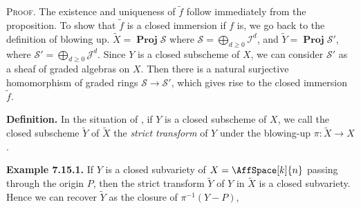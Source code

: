 {\smallskip
\noindent\textsc{Proof.} The existence and uniqueness of $\widetilde f$ follow immediately from the proposition. To show that $\widetilde f$ is a closed immersion if $f$ is, we go back to the definition of blowing up. $\widetilde X=\operatorname{\mathbf{Proj}}\mathcal S$ where $\mathcal S=\bigoplus_{d\geq0}\mathcal I^d$, and $\widetilde Y=\operatorname{\mathbf{Proj}}\mathcal S'$, where $\mathcal S'=\bigoplus_{d\geq0}\mathcal J^d$. Since $Y$ is a closed subscheme of $X$, we can consider $\mathcal S'$ as a sheaf of graded algebras on $X$. Then there is a natural surjective homomorphism of graded rings $\mathcal S\to\mathcal S'$, which gives rise to the closed immersion $\widetilde f$.

\medskip
\noindent\textbf{Definition.} In the situation of , if $Y$ is a closed subscheme of $X$, we call the closed subscheme $\widetilde Y$ of $\widetilde X$ the \emph{strict transform} of $Y$ under the blowing-up $\pi\colon\widetilde X\to X$.

\medskip
\noindent\hypertarget{result-II-7.15.1}{}\textbf{Example 7.15.1.} If $Y$ is a closed subvariety of $X=\AffSpace[k]{n}$ passing through the origin $P$, then the strict transform $\widetilde Y$ of $Y$ in $\widetilde X$ is a closed subvariety. Hence\EditionText{} we can recover $\widetilde Y$ as the closure of $\pi^{-1}(Y-P)$,
}
\usetikzlibrary{arrows}
